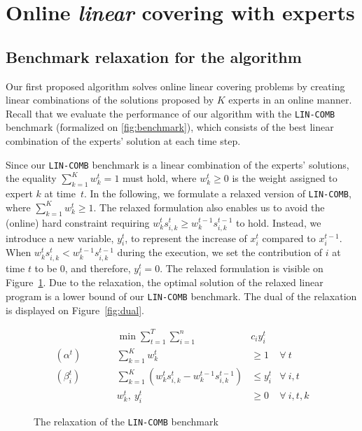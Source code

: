 
\section{Online \emph{linear} covering with experts}	\label{sec:covering}

\subsection{Benchmark relaxation for the algorithm}

Our first proposed algorithm solves online linear covering problems by creating linear combinations of the solutions proposed by $K$ experts in an online manner.
Recall that we evaluate the performance of our algorithm with the \texttt{LIN-COMB} benchmark (formalized on \cref{fig:benchmark}), which consists of the best linear combination of the experts' solution at each time step.

Since our \texttt{LIN-COMB} benchmark is a linear combination of the experts' solutions, the equality $ \sum_{k=1}^{K} w_{k}^{t} = 1$ must hold, where $w_{k}^{t} \geq 0$ is the weight assigned to expert $k$ at time~$t$. In the following, we formulate a relaxed version of \texttt{LIN-COMB}, where
$\sum_{k=1}^{K} w_{k}^{t} \geq 1$. The relaxed formulation also enables us to avoid the (online) hard constraint requiring $w_{k}^{t} s_{i,k}^{t} \geq w_{k}^{t-1} s_{i,k}^{t-1}$ to hold. Instead, we introduce a new variable, $y_{i}^{t}$, to represent the increase of $x_{i}^{t}$ compared to $x_{i}^{t-1}$. When $w_{k}^{t} s_{i,k}^{t} < w_{k}^{t-1} s_{i,k}^{t-1}$ during the execution, we set the contribution of $i$ at time $t$ to be 0, and therefore, $y_{i}^{t} = 0$.
The relaxed formulation is visible on Figure~\ref{fig:relaxation}. Due to the relaxation, the optimal solution of the relaxed linear program is a lower bound of our \texttt{LIN-COMB} benchmark. The dual of the relaxation is displayed on Figure~\ref{fig:dual}.


\begin{figure}[ht]
	\begin{mdframed}
		\begin{align*}
			&& \min \sum_{t = 1}^{T} \sum_{i=1}^{n} & c_i y_i^t \\
			(\alpha^{t}) \qquad && \sum_{k=1}^{K} w_{k}^{t} & \geq 1  & \forall\ t \\
			(\beta_{i}^{t}) \qquad && \sum_{k=1}^{K} \left(w_{k}^{t} s_{i,k}^{t} - w_{k}^{t-1} s_{i,k}^{t-1} \right) &\leq y_i^t  &\forall\ i,t\\
			&& w_{k}^{t},\ y_{i}^{t} & \ge 0 & \forall\ i,t,k
		\end{align*}
	\end{mdframed}
	\caption{The relaxation of the \texttt{LIN-COMB} benchmark}
	\label{fig:relaxation}
\end{figure}


